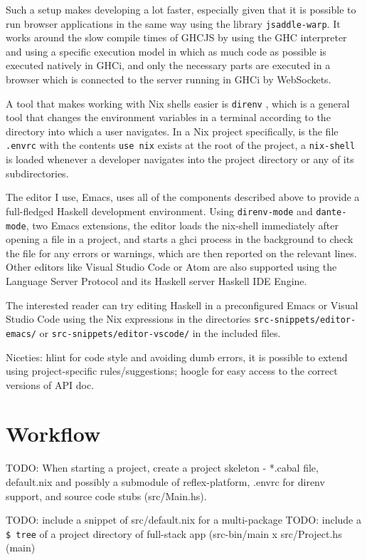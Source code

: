 \documentclass[english,odsaz]{fitthesis}
\begin{document}
Such a setup makes developing a lot faster, especially given that it is possible
to run browser applications in the same way using the library \texttt{jsaddle-warp}. It
works around the slow compile times of GHCJS by using the GHC interpreter and
using a specific execution model in which as much code as possible is executed
natively in GHCi, and only the necessary parts are executed in a browser which
is connected to the server running in GHCi by WebSockets.

A tool that makes working with Nix shells easier is \texttt{direnv} \cite{direnv}, which is
a general tool that changes the environment variables in a terminal according to
the directory into which a user navigates. In a Nix project specifically, is the
file \texttt{.envrc} with the contents \texttt{use nix} exists at the root of the project, a
\texttt{nix-shell} is loaded whenever a developer navigates into the project directory or
any of its subdirectories.

The editor I use, Emacs, uses all of the components described above to provide a
full-fledged Haskell development environment. Using \texttt{direnv-mode} and \texttt{dante-mode},
two Emacs extensions, the editor loads the nix-shell immediately after opening a
file in a project, and starts a ghci process in the background to check the file
for any errors or warnings, which are then reported on the relevant lines.
Other editors like Visual Studio Code or Atom are also supported using the
Language Server Protocol and its Haskell server Haskell IDE Engine.

The interested reader can try editing Haskell in a preconfigured Emacs or Visual
Studio Code using the Nix expressions in the directories
\texttt{src-snippets/editor-emacs/} or \texttt{src-snippets/editor-vscode/} in the included files.

Niceties: hlint for code style and avoiding dumb errors, it is possible to
extend using project-specific rules/suggestions; hoogle for easy access
to the correct versions of API doc.

\section{Workflow}
\label{sec:orgf87e0a6}
TODO: When starting a project, create a project skeleton - *.cabal file,
default.nix and possibly a submodule of reflex-platform, .envrc for direnv
support, and source code stubs (src/Main.hs).

TODO: include a snippet of src/default.nix for a multi-package
TODO: include a \texttt{\$ tree} of a project directory of full-stack app (src-bin/main x
src/Project.hs (main)
\end{document}
